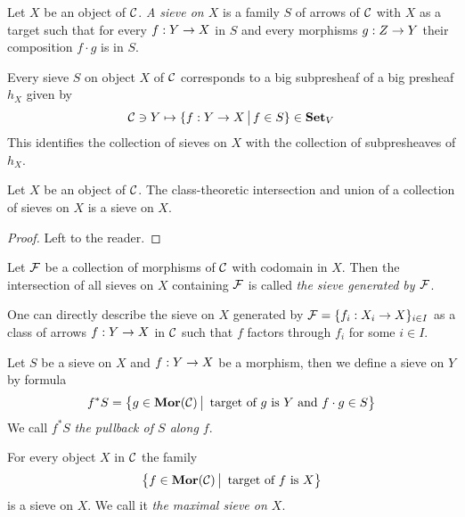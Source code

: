 \begin{definition}
Let $X$ be an object of ${\mathcal C}$. \textit{A sieve on $X$} is a family $S$ of arrows of ${\mathcal C}$ with $X$ as a target such that for every $f:Y\rightarrow X$ in $S$ and every morphisms $g:Z\rightarrow Y$ their composition $f\cdot g$ is in $S$.
\end{definition}
\noindent
Every sieve $S$ on object $X$ of ${\mathcal C}$ corresponds to a big subpresheaf of a big presheaf $h_X$ given by
$${\mathcal C}\ni Y\mapsto \{f:Y\rightarrow X\,\big|\,f\in S\}\in \mathbf{Set}_V$$
This identifies the collection of sieves on $X$ with the collection of subpresheaves of $h_X$.

\begin{fact}\label{fact:propertiesofsieves}
Let $X$ be an object of ${\mathcal C}$. The class-theoretic intersection and union of a collection of sieves on $X$ is a sieve on $X$.
\end{fact}
\begin{proof}
Left to the reader.
\end{proof}

\begin{definition}
Let ${\mathcal F}$ be a collection of morphisms of ${\mathcal C}$ with codomain in $X$. Then the intersection of all sieves on $X$ containing ${\mathcal F}$ is called \textit{the sieve generated by ${\mathcal F}$}.
\end{definition}
\noindent
One can directly describe the sieve on $X$ generated by ${\mathcal F} = \{f_i:X_i\rightarrow X\}_{i\in I}$ as a class of arrows $f:Y\rightarrow X$ in ${\mathcal C}$ such that $f$ factors through $f_i$ for some $i\in I$. 

\begin{definition}
Let $S$ be a sieve on $X$ and $f:Y\rightarrow X$ be a morphism, then we define a sieve on $Y$ by formula
$$f^*S=\big\{g\in \mathbf{Mor}({\mathcal C})\,\big|\,\mbox{ target of }g\mbox{ is }Y\mbox{ and }f\cdot g\in S\big\}$$
We call $f^*S$ \textit{the pullback of $S$ along $f$}.
\end{definition}

\begin{definition}
For every object $X$ in ${\mathcal C}$ the family 
$$\big\{f\in \mathbf{Mor}({\mathcal C})\,\big|\,\mbox{ target of }f\mbox{ is }X\big\}$$
is a sieve on $X$. We call it \textit{the maximal sieve on $X$}.
\end{definition}
 
